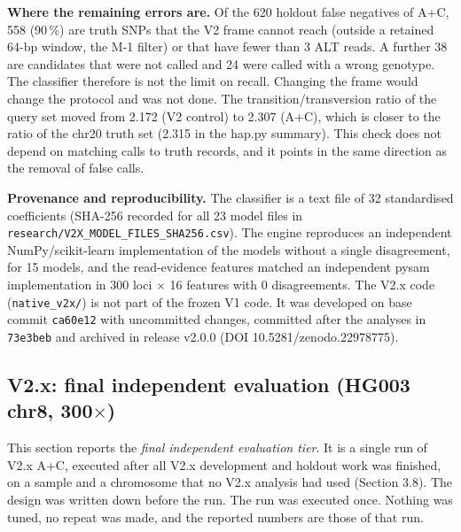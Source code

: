 \documentclass[11pt,a4paper]{article}
\makeatletter
\newcommand{\needspace}[1]{\par\ifdim\pagegoal=\maxdimen\else\dimen@=\pagegoal\advance\dimen@-\pagetotal\ifdim\dimen@<#1\relax\newpage\fi\fi}
\makeatother
\begin{document}
\textbf{Where the remaining errors are.} Of the 620 holdout false negatives of A+C, 558 (90\,\%) are truth SNPs that the V2 frame cannot reach (outside a retained 64-bp window, the M-1 filter) or that have fewer than 3 ALT reads. A further 38 are candidates that were not called and 24 were called with a wrong genotype. The classifier therefore is not the limit on recall. Changing the frame would change the protocol and was not done. The transition/transversion ratio of the query set moved from 2.172 (V2 control) to 2.307 (A+C), which is closer to the ratio of the chr20 truth set (2.315 in the hap.py summary). This check does not depend on matching calls to truth records, and it points in the same direction as the removal of false calls.

\textbf{Provenance and reproducibility.} The classifier is a text file of 32 standardised coefficients (SHA-256 recorded for all 23 model files in \texttt{research/\allowbreak{}V2X\_\allowbreak{}MODEL\_\allowbreak{}FILES\_\allowbreak{}SHA256.\allowbreak{}csv}). The engine reproduces an independent NumPy/scikit-learn implementation of the models without a single disagreement, for 15 models, and the read-evidence features matched an independent pysam implementation in 300 loci $\times$ 16 features with 0 disagreements. The V2.x code (\texttt{native\_\allowbreak{}v2x/\allowbreak{}}) is not part of the frozen V1 code. It was developed on base commit \texttt{ca60e12} with uncommitted changes, committed after the analyses in \texttt{73e3beb} and archived in release v2.0.0 (DOI 10.5281/zenodo.22978775).

\needspace{6\baselineskip}
\subsection{\texorpdfstring{V2.x: final independent evaluation (HG003 chr8, 300$\times$)}{V2.x: final independent evaluation (HG003 chr8, 300x)}}
This section reports the \emph{final independent evaluation tier}. It is a single run of V2.x A+C, executed after all V2.x development and holdout work was finished, on a sample and a chromosome that no V2.x analysis had used (Section 3.8). The design was written down before the run. The run was executed once. Nothing was tuned, no repeat was made, and the reported numbers are those of that run.
\end{document}

